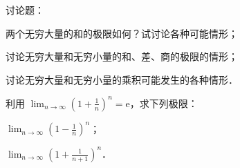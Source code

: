 \begin{xiti}
\item 讨论题：
  \begin{ziti}
  \item 两个无穷大量的和的极限如何？试讨论各种可能情形；
  \item 讨论无穷大量和无穷小量的和、差、商的极限的情形；
  \item 讨论无穷大量和无穷小量的乘积可能发生的各种情形．
  \end{ziti}
\item 利用 $\lim_{n\to\infty}\left(1+\frac{1}{n}\right)^n = \mathrm{e}$，求下列极限：
  \begin{ziti}
  \item $\lim_{n \to \infty} \left(1 - \frac{1}{n}\right)^n$；
  \item $\lim_{n \to \infty} \left(1 + \frac{1}{n + 1}\right)^n$．
  \end{ziti}
\end{xiti}
